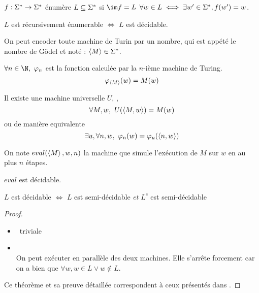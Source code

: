 \begin{definition}
	$f : \Sigma^{*} \to \Sigma^{*}$ énumère $L \subseteq \Sigma^{*}$ si $\im f = L$ \ie $\forall w \in L \iff \exists w' \in \Sigma^{*}, f (w') = w$.
\end{definition}

\begin{prop}
	$L$ est récursivement énumerable $\iff$ $L$ est décidable.
\end{prop}

On peut encoder toute machine de Turin par un nombre, qui est appété le nombre de Gödel et noté : $\left\langle M\right\rangle \in \Sigma^{*}$.

\begin{definition} \label{def:enum}
	$\forall n \in \N, \ \phi_n$ est la fonction calculée par la $n$-ième machine de Turing.
	$$\varphi_{\left\langle M\right\rangle} (w) = M (w)$$
\end{definition}


\begin{lemma}\label{lem:univ}
	Il existe une machine universelle $U$, \ie, $$\forall M,w, \  U (\left\langle M,w\right\rangle) = M (w)$$
	ou de manière equivalente
	$$\exists u, \forall n,w, \ \varphi_n(w) = \varphi_u(\left\langle n,w\right\rangle)$$
\end{lemma}

\begin{definition}[eval]
	On note $eval(\left\langle M\right\rangle, w, n)$ la machine que simule l'exécution de $M$ sur $w$ en au plus $n$ étapes.
\end{definition}

\begin{prop}[Admis]
	$eval$ est décidable.
\end{prop}

\begin{prop}
	$L$ est décidable $\iff$ $L$ est semi-décidable \emph{et} $L^c$ est semi-décidable
\end{prop}

\begin{proof}
	\begin{itemize}
		\item \bimpLR \ triviale
		\item \bimpRL \\
		      On peut exécuter en parallèle des deux machines. Elle s'arrête forcement car on a bien que $\forall w, w \in L \lor w \notin L$.
	\end{itemize}
	Ce théorème et sa preuve détaillée correspondent à ceux présentés dans \cite[Theorem~4.22]{sipser}.
\end{proof}


